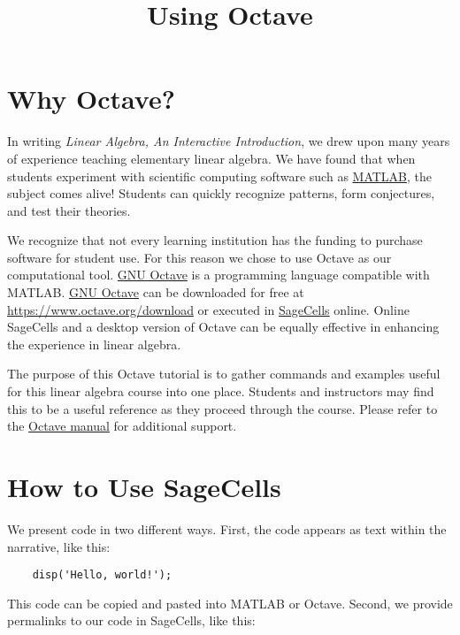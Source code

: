 \documentclass{ximera}
\title{Using Octave} \license{CC BY-NC-SA 4.0}
\begin{document}
\begin{abstract}
\end{abstract}
\maketitle
\section*{Why Octave?}

In writing \textit{Linear Algebra, An Interactive Introduction}, we drew upon many years of experience teaching elementary linear algebra.  We have found that when students experiment with scientific computing software such as \href{https://www.mathworks.com/products/matlab.html}{MATLAB}, the subject comes alive!  Students can quickly recognize patterns, form conjectures, and test their theories.  

We recognize that not every learning institution has the funding to purchase software for student use.  For this reason we chose to use Octave as our computational tool.  \href{https://en.wikipedia.org/wiki/GNU_Octave}{GNU Octave} is a programming language compatible with MATLAB.  \href{https://www.octave.org/}{GNU Octave} can be downloaded for free at \href{https://www.octave.org/download}{https://www.octave.org/download} or executed in \href{https://sagecell.sagemath.org/}{SageCells} online.  Online SageCells and a desktop version of Octave can be equally effective in enhancing the experience in linear algebra.

The purpose of this Octave tutorial is to gather commands and examples useful for this linear algebra course into one place.  Students and instructors may find this to be a useful reference as they proceed through the course. Please refer to the \href{https://octave.org/support}{Octave manual} for additional support.

\section*{How to Use SageCells}
We present code in two different ways.  First, the code appears as text within the narrative, like this:

\begin{verbatim}
    disp('Hello, world!');
\end{verbatim}

This code can be copied and pasted into MATLAB or Octave.  Second, we provide permalinks to our code in SageCells, like this:
\end{document}
